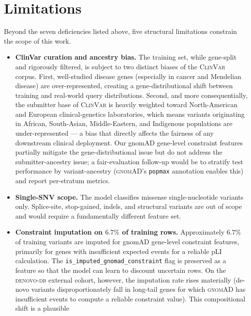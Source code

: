 \documentclass[11pt,a4paper,oneside]{report}
\begin{document}
\section{Limitations}
\label{sec:conc-limits}

Beyond the seven deficiencies listed above, five
structural limitations constrain the scope of this work.

\begin{itemize}[leftmargin=1.8em, itemsep=0.2em]
\item \textbf{ClinVar curation and ancestry bias.} The
  training set, while gene-split and rigorously filtered, is
  subject to two distinct biases of the \textsc{ClinVar}
  corpus. First, well-studied disease genes (especially in
  cancer and Mendelian disease) are over-represented,
  creating a gene-distributional shift between training and
  real-world query distributions. Second, and more
  consequentially, the submitter base of \textsc{ClinVar} is
  heavily weighted toward North-American and European
  clinical-genetics laboratories, which means variants
  originating in African, South-Asian, Middle-Eastern, and
  Indigenous populations are under-represented --- a bias
  that directly affects the fairness of any downstream
  clinical deployment. Our gnomAD gene-level constraint
  features partially mitigate the gene-distributional issue
  but do not address the submitter-ancestry issue; a
  fair-evaluation follow-up would be to stratify test
  performance by variant-ancestry (\textsc{gnomAD}'s
  \texttt{popmax} annotation enables this) and report
  per-stratum metrics.
\item \textbf{Single-SNV scope.} The model classifies
  missense single-nucleotide variants only. Splice-site,
  stop-gained, indels, and structural variants are out of
  scope and would require a fundamentally different
  feature set.
\item \textbf{Constraint imputation on $6.7\%$ of training
  rows.} Approximately $6.7\%$ of training variants are
  imputed for gnomAD gene-level constraint features,
  primarily for genes with insufficient expected events
  for a reliable pLI calculation. The
  \texttt{is\_imputed\_gnomad\_constraint} flag is
  preserved as a feature so that the model can learn to
  discount uncertain rows. On the \textsc{denovo-db}
  external cohort, however, the imputation rate rises
  materially (de-novo variants disproportionately fall in
  long-tail genes for which \textsc{gnomAD} has
  insufficient events to compute a reliable constraint
  value). This compositional shift is a plausible

\end{itemize}
\end{document}
